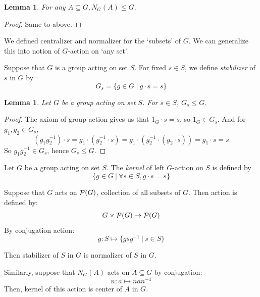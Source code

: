 \documentclass[12pt, a4paper, openany, twoside]{book}
\newtheorem{lem}[thm]{Lemma}
\theoremstyle{definition}
\theoremstyle{remark}
\theoremstyle{plain}
\numberwithin{equation}{section}
\begin{document}
\begin{lem}
    For any $A \subseteq G, N_G(A) \leq G$. 
\end{lem}
\begin{proof}
    Same to above. 
\end{proof}

We defined centralizer and normalizer for the \lq subsets' of $G$. We can generalize this into notion of $G$-action on \lq any set'. 

\begin{tcolorbox}[colback=yellow!10!white,colframe=brown!75!black,title=Stabilizer]

Suppose that $G$ is a group acting on set $S$. For fixed $s \in S$, we define \textit{stabilizer} of $s$ in $G$ by 
\[G_s = \{g \in G ~|~ g \cdot s = s\}\]

\end{tcolorbox}

\begin{lem}
Let $G$ be a group acting on set $S$. For $s \in S$, $G_s \leq G$. 
\end{lem}

\begin{proof}
    
The axiom of group action gives us that $1_G \cdot s = s$, so $1_G \in G_s$. And for $g_1, g_2 \in G_s$, 
\[(g_1 g_2^{-1}) \cdot s = g_1 \cdot (g_2^{-1} \cdot s) = g_1 \cdot (g_2^{-1} \cdot (g_2 \cdot s)) = g_1 \cdot s = s\]
So $g_1 g_2^{-1} \in G_s$, hence $G_s \leq G$. 

\end{proof}

\begin{tcolorbox}[colback=yellow!10!white,colframe=brown!75!black,title=Kernel]

Let $G$ be a group acting on set $S$. The \textit{kernel} of left $G$-action on $S$ is defined by 
\[\{g \in G ~|~ \forall s \in S, g \cdot s = s\}\]

\end{tcolorbox}

\begin{tcolorbox}[colback=yellow!10!white,colframe=green!75!black,title=Connections between stabilizer and normalizer]

Suppose that $G$ acts on ${\mathcal {P}}(G)$, collection of all subsets of $G$. 
Then action is defined by: 
\[G \times {\mathcal {P}}(G) \rightarrow {\mathcal {P}}(G)\]
By conjugation action:
\[g: S \mapsto \{gsg^{-1} ~|~ s \in S\}\]

Then stabilizer of $S$ in $G$ is normalizer of $S$ in $G$. 

Similarly, suppose that $N_G(A)$ acts on $A \subseteq G$ by conjugation: 
\[n: a \mapsto nan^{-1}\]
Then, kernel of this action is center of $A$ in $G$. 

\end{tcolorbox}
\end{document}

